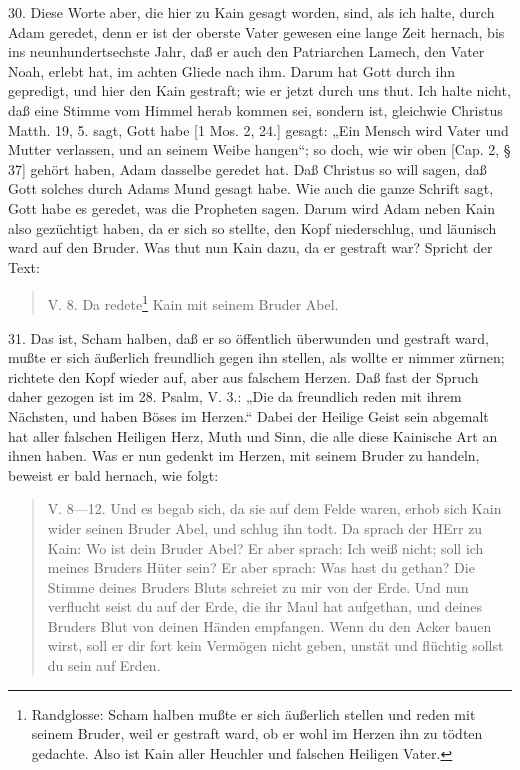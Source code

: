 30. Diese Worte aber, die hier zu Kain gesagt worden, sind, als ich halte, durch Adam geredet, denn er ist der oberste Vater gewesen eine lange Zeit hernach, bis ins neunhundertsechste Jahr, daß er auch den Patriarchen Lamech, den Vater Noah, erlebt hat, im achten Gliede nach ihm. Darum hat Gott durch ihn gepredigt, und hier den Kain gestraft; wie er jetzt durch uns thut. Ich halte nicht, daß eine Stimme vom Himmel herab kommen sei, sondern ist, gleichwie Christus Matth. 19, 5. sagt, Gott habe [1 Mos. 2, 24.] gesagt: „Ein Mensch wird Vater und Mutter verlassen, und an seinem Weibe hangen“; so doch, wie wir oben [Cap. 2, § 37] gehört haben, Adam dasselbe geredet hat. Daß Christus so will sagen, daß Gott solches durch Adams Mund gesagt habe. Wie auch die ganze Schrift sagt, Gott habe es geredet, was die Propheten sagen. Darum wird Adam neben Kain also gezüchtigt haben, da er sich so stellte, den Kopf niederschlug, und läunisch ward auf den Bruder. Was thut nun Kain dazu, da er gestraft war? Spricht der Text:

\begin{quote}
V. 8. Da redete\footnote{Randglosse: Scham halben mußte er sich äußerlich stellen und reden mit seinem Bruder, weil er gestraft ward, ob er wohl im Herzen ihn zu tödten gedachte. Also ist Kain aller Heuchler und falschen Heiligen Vater.} Kain mit seinem Bruder Abel.
\end{quote}

31. Das ist, Scham halben, daß er so öffentlich überwunden und gestraft ward, mußte er sich äußerlich freundlich gegen ihn stellen, als wollte er nimmer zürnen; richtete den Kopf wieder auf, aber aus falschem Herzen. Daß fast der Spruch daher gezogen ist im 28. Psalm, V. 3.: „Die da freundlich reden mit ihrem Nächsten, und haben Böses im Herzen.“ Dabei der Heilige Geist sein abgemalt hat aller falschen Heiligen Herz, Muth und Sinn, die alle diese Kainische Art an ihnen haben. Was er nun gedenkt im Herzen, mit seinem Bruder zu handeln, beweist er bald hernach, wie folgt:

\begin{quote}
V. 8—12. Und es begab sich, da sie auf dem Felde waren, erhob sich Kain wider seinen Bruder Abel, und schlug ihn todt. Da sprach der HErr zu Kain: Wo ist dein Bruder Abel? Er aber sprach: Ich weiß nicht; soll ich meines Bruders Hüter sein? Er aber sprach: Was hast du gethan? Die Stimme deines Bruders Bluts schreiet zu mir von der Erde. Und nun verflucht seist du auf der Erde, die ihr Maul hat aufgethan, und deines Bruders Blut von deinen Händen empfangen. Wenn du den Acker bauen wirst, soll er dir fort kein Vermögen nicht geben, unstät und flüchtig sollst du sein auf Erden.
\end{quote}

